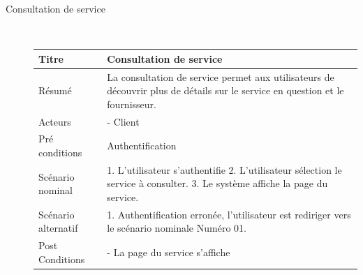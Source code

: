 \documentclass[french]{report}
\begin{document}
\begin{description}
        \item[Consultation de service] \hfill \\
        \begin{minipage}{\linewidth}
        \centering
            \def\arraystretch{2}
            \begin{tabular}{|m{3cm}|m{9cm}|}
            \hline
            Titre                & Consultation de service \\ 
            \hline
            Résumé               & La consultation de service permet aux utilisateurs de découvrir
	    plus de détails sur le service en question et le fournisseur. \\ 
            \hline
            Acteurs              & - Client \\ 
            \hline
            Pré conditions       & Authentification \\ 
            \hline
            Scénario nominal     &  
                1. L'utilisateur s'authentifie
                2. L'utilisateur sélection le service à consulter. 
                3. Le système affiche la page du service.
            \\ 
            \hline
            Scénario alternatif &   
                1. Authentification erronée, l'utilisateur est rediriger vers le scénario nominale Numéro 01.
                
            \\ 
            \hline
            Post Conditions & 
                - La page du service s'affiche 
            \\
            \hline
            \end{tabular}
        \end{minipage}
        

\end{description}
\end{document}
